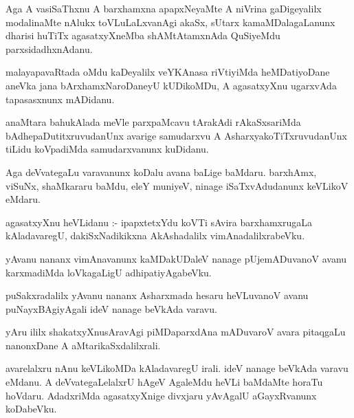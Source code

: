 \documentclass{article}
\begin{document}
\begin{mn}
Aga  A  vasiSaThxnu  A  barxhamxna  apapxNeyaMte  A  niVrina  gaDigeyalilx  modalinaMte  nAlukx  toVLuLaLxvanAgi  
akaSx,  sUtarx  kamaMDalagaLanunx  dharisi  huTiTx  agasatxyXneMba  shAMtAtamxnAda  QuSiyeMdu  parxsidadhxnAdanu.
\end{mn}

\begin{mn}
malayapavaRtada  oMdu  kaDeyalilx  veYKAnasa  riVtiyiMda  heMDatiyoDane  aneVka  jana  bArxhamxNaroDaneyU  kUDikoMDu,  
A  agasatxyXnu  ugarxvAda  tapasasxnunx  mADidanu.
\end{mn}

\begin{mn}
anaMtara  bahukAlada  meVle  parxpaMcavu  tArakAdi  rAkaSxsariMda  bAdhepaDutitxruvudanUnx  
avarige  samudarxvu  A  AsharxyakoTiTxruvudanUnx  tiLidu  koVpadiMda  samudarxvanunx  kuDidanu.
\end{mn}

\begin{mn}
Aga  deVvategaLu  varavanunx  koDalu  avana  baLige  baMdaru.  barxhAmx,  viSuNx,  shaMkararu  
baMdu,  eleY  muniyeV,  ninage  iSaTxvAdudanunx  keVLikoV  eMdaru.
\end{mn}

\begin{mn}
agasatxyXnu  heVLidanu :- ipapxtetxYdu koVTi sAvira  barxhamxrugaLa  kAladavaregU,  dakiSxNadikikxna  
AkAshadalilx  vimAnadalilxrabeVku.
\end{mn}

\begin{mn}
yAvanu  nananx  vimAnavanunx  kaMDakUDaleV  nanage  pUjemADuvanoV  avanu  karxmadiMda  loVkagaLigU  adhipatiyAgabeVku.
\end{mn}

\begin{mn}
puSakxradalilx  yAvanu  nananx  Asharxmada  hesaru  heVLuvanoV  avanu  puNayxBAgiyAgali  ideV  nanage  beVkAda  varavu.
\end{mn}

\begin{mn}
yAru  ililx  shakatxyXnusAravAgi  piMDaparxdAna  mADuvaroV  avara  pitaqgaLu  nanonxDane  A  aMtarikaSxdalilxrali.
\end{mn}

\begin{mn}
avarelalxru  nAnu  keVLikoMDa  kAladavaregU  irali.  ideV  nanage  beVkAda  varavu  eMdanu.  A  deVvategaLelalxrU  
hAgeV  AgaleMdu  heVLi  baMdaMte  horaTu  hoVdaru.  AdadxriMda  agasatxyXnige  divxjaru  yAvAgalU  aGayxRvanunx  koDabeVku.
\end{mn}
\end{document}

